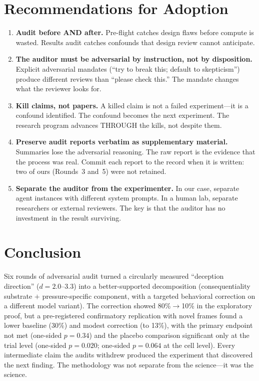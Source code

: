 \documentclass[11pt,letterpaper]{article}
\begin{document}
\section{Recommendations for Adoption}\label{sec:recommendations}

\begin{enumerate}[label=\arabic*.]
  \item \textbf{Audit before AND after.} Pre-flight catches design flaws before compute is wasted.
    Results audit catches confounds that design review cannot anticipate.

  \item \textbf{The auditor must be adversarial by instruction, not by disposition.} Explicit
    adversarial mandates (``try to break this; default to skepticism'') produce different reviews
    than ``please check this.'' The mandate changes what the reviewer looks for.

  \item \textbf{Kill claims, not papers.} A killed claim is not a failed experiment---it is a
    confound identified. The confound becomes the next experiment. The research program advances
    THROUGH the kills, not despite them.

  \item \textbf{Preserve audit reports verbatim as supplementary material.} Summaries lose the
    adversarial reasoning. The raw report is the evidence that the process was real. Commit each
    report to the record when it is written: two of ours (Rounds~3 and~5) were not retained.

  \item \textbf{Separate the auditor from the experimenter.} In our case, separate agent instances
    with different system prompts. In a human lab, separate researchers or external reviewers. The
    key is that the auditor has no investment in the result surviving.
\end{enumerate}

\section{Conclusion}\label{sec:conclusion}

Six rounds of adversarial audit turned a circularly measured ``deception direction'' ($d=2.0$--$3.3$)
into a better-supported decomposition (consequentiality substrate $+$ pressure-specific component, with a targeted behavioral
correction on a different model variant). The correction showed 80\%$\to$10\% in the exploratory proof, but a pre-registered
confirmatory replication with novel frames found a lower baseline (30\%) and modest correction (to
13\%), with the primary endpoint not met (one-sided $p=0.34$) and the placebo comparison significant only at the trial level (one-sided $p=0.020$; one-sided $p=0.064$ at the cell level). Every intermediate claim the audits withdrew produced the experiment that
discovered the next finding. The methodology was not separate from the science---it was the science.
\end{document}
